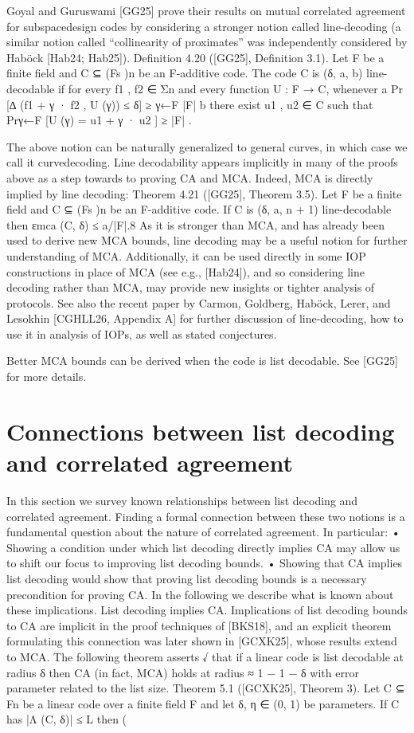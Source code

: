 \documentclass[11pt]{article}
\begin{document}
Goyal and Guruswami [GG25] prove their results on mutual correlated agreement for subspacedesign codes by considering a stronger notion called line-decoding (a similar notion called “collinearity of proximates” was independently considered by Haböck [Hab24; Hab25]).
Definition 4.20 ([GG25], Definition 3.1). Let F be a finite field and C ⊆ (Fs )n be an F-additive
code. The code C is (δ, a, b) line-decodable if for every f1 , f2 ∈ Σn and every function U : F → C,
whenever
a
Pr [∆ (f1 + γ · f2 , U (γ)) ≤ δ] ≥
γ←F
|F|
b
there exist u1 , u2 ∈ C such that Prγ←F [U (γ) = u1 + γ · u2 ] ≥ |F|
.

The above notion can be naturally generalized to general curves, in which case we call it curvedecoding. Line decodability appears implicitly in many of the proofs above as a step towards to
proving CA and MCA. Indeed, MCA is directly implied by line decoding:
Theorem 4.21 ([GG25], Theorem 3.5). Let F be a finite field and C ⊆ (Fs )n be an F-additive code.
If C is (δ, a, n + 1) line-decodable then εmca (C, δ) ≤ a/|F|.8
As it is stronger than MCA, and has already been used to derive new MCA bounds, line
decoding may be a useful notion for further understanding of MCA. Additionally, it can be used
directly in some IOP constructions in place of MCA (see e.g., [Hab24]), and so considering line
decoding rather than MCA, may provide new insights or tighter analysis of protocols. See also
the recent paper by Carmon, Goldberg, Haböck, Lerer, and Lesokhin [CGHLL26, Appendix A] for
further discussion of line-decoding, how to use it in analysis of IOPs, as well as stated conjectures.


Better MCA bounds can be derived when the code is list decodable. See [GG25] for more details.


\section{Connections between list decoding and correlated agreement}



In this section we survey known relationships between list decoding and correlated agreement.
Finding a formal connection between these two notions is a fundamental question about the nature
of correlated agreement. In particular:
• Showing a condition under which list decoding directly implies CA may allow us to shift our
focus to improving list decoding bounds.
• Showing that CA implies list decoding would show that proving list decoding bounds is a necessary precondition for proving CA.
In the following we describe what is known about these implications.
List decoding implies CA. Implications of list decoding bounds to CA are implicit in the proof
techniques of [BKS18], and an explicit theorem formulating this connection was later shown in
[GCXK25], whose results extend to MCA. The following theorem asserts
√ that if a linear code is list
decodable at radius δ then CA (in fact, MCA) holds at radius ≈ 1 − 1 − δ with error parameter
related to the list size.
Theorem 5.1 ([GCXK25], Theorem 3). Let C ⊆ Fn be a linear code over a finite field F and let
δ, η ∈ (0, 1) be parameters. If C has |Λ (C, δ)| ≤ L then
(
\end{document}
